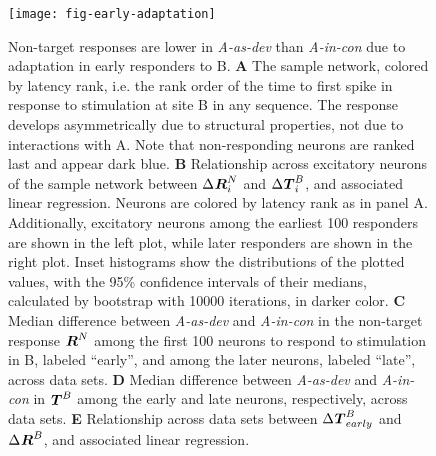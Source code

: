 \documentclass[9pt,lineno,onehalfspacing]{elife}
\newcommand{\dev}{\textit{A-as-dev}}
\newcommand{\msc}{\textit{A-in-con}}
\newcommand{\std}{\textit{A-as-std}}
\newcommand{\ifstringequal}[4]{%
  \ifnum\pdfstrcmp{#1}{#2}=0
  #3%
  \else
  #4%
  \fi
}
\newcommand{\seqreplace}[1]{\ifstringequal{dev}{#1}{\dev}{%
    \ifstringequal{std}{#1}{\std}{%
        \ifstringequal{msc}{#1}{\msc}{#1}%
    }%
}}
\newcommand{\R}[3][]{{}^{\seqreplace{#1}}_{}\boldsymbol R^{#2}_{#3}}
\newcommand{\T}[3][]{{}^{\seqreplace{#1}}_{}\boldsymbol T^{#2}_{#3}}
\begin{document}
\begin{figure}
    \texttt{[image: fig-early-adaptation]}
    \caption{%
        Non-target responses are lower in \dev{} than \msc{} due to adaptation in early responders to B.
        \textbf{A} The sample network, colored by latency rank, i.e. the rank order of the time to first spike in response to stimulation at site B in any sequence. The response develops asymmetrically due to structural properties, not due to interactions with A. Note that non-responding neurons are ranked last and appear dark blue.
        \textbf{B} Relationship across excitatory neurons of the sample network between $\Delta \R{N}{i}$ and $\Delta \T{B}{i}$, and associated linear regression. Neurons are colored by latency rank as in panel A. Additionally, excitatory neurons among the earliest 100 responders are shown in the left plot, while later responders are shown in the right plot. Inset histograms show the distributions of the plotted values, with the 95\% confidence intervals of their medians, calculated by bootstrap with 10000 iterations, in darker color.
        \textbf{C} Median difference between \dev{} and \msc{} in the non-target response $\R{N}{}$ among the first 100 neurons to respond to stimulation in B, labeled ``early'', and among the later neurons, labeled ``late'', across data sets.
        \textbf{D} Median difference between \dev{} and \msc{} in $\T{B}{}$ among the early and late neurons, respectively, across data sets.
        \textbf{E} Relationship across data sets between $\Delta \T{B}{early}$ and $\Delta \R{B}{}$, and associated linear regression.
    }
    \label{fig:early-adaptation}
\end{figure}
\end{document}
